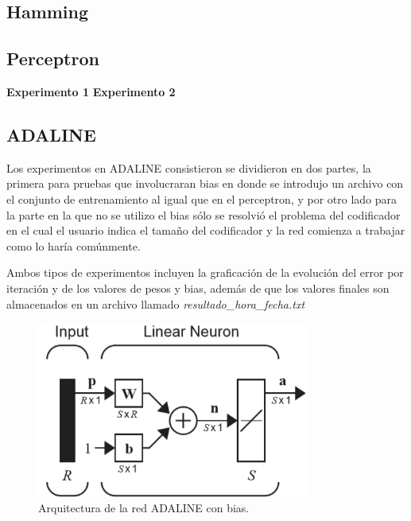 
\subsection{Hamming}

\newpage
\subsection{Perceptron}
\textbf{Experimento 1}
\textbf{Experimento 2}
\subsection{ADALINE}
Los experimentos en ADALINE consistieron se dividieron en dos partes, la primera para pruebas que involucraran bias en donde se introdujo un archivo con el conjunto de entrenamiento al igual que en el perceptron, y por otro lado para la parte en la que no se utilizo el bias sólo se resolvió el problema del codificador en el cual el usuario indica el tamaño del codificador y la red comienza a trabajar como lo haría comúnmente.

Ambos tipos de experimentos incluyen la graficación de la evolución del error por iteración y de los valores de pesos y bias, además de que los valores finales son almacenados en un archivo llamado \emph{resultado\_hora\_fecha.txt}
\begin{figure}[H]
    \begin{center}
        \includegraphics[width=9cm]{img/adaline/arquitectura.png}
        \caption{Arquitectura de la red ADALINE con bias. \cite{libro1}}
        \label{fig:adaline-diagrama2}
    \end{center}
\end{figure}
